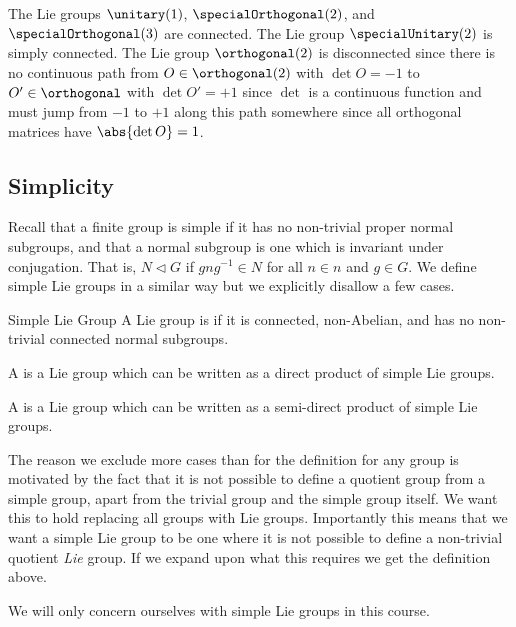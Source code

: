 \documentclass[fleqn]{NotesClass}
\newcommand*{\normalsubgroup}{\vartriangleleft}
\begin{document}
    \begin{exm}{}{}
        The Lie groups \(\unitary(1)\), \(\specialOrthogonal(2)\), and \(\specialOrthogonal(3)\) are connected.
        The Lie group \(\specialUnitary(2)\) is simply connected.
        The Lie group \(\orthogonal(2)\) is disconnected since there is no continuous path from \(O \in \orthogonal(2)\) with \(\det O = -1\) to \(O' \in \orthogonal\) with \(\det O' = +1\) since \(\det\) is a continuous function and must jump from \(-1\) to \(+1\) along this path somewhere since all orthogonal matrices have \(\abs{\det O} = 1\).
    \end{exm}
    
    \subsection{Simplicity}
    Recall that a finite group is simple if it has no non-trivial proper normal subgroups, and that a normal subgroup is one which is invariant under conjugation.
    That is, \(N \normalsubgroup G\) if \(gng^{-1} \in N\) for all \(n \in n\) and \(g \in G\).
    We define simple Lie groups in a similar way but we explicitly disallow a few cases.
    
    \begin{dfn}{Simple Lie Group}{}
        A Lie group is  if it is connected, non-Abelian, and has no non-trivial connected normal subgroups.
        
        A  is a Lie group which can be written as a direct product of simple Lie groups.
        
        A  is a Lie group which can be written as a semi-direct product of simple Lie groups.
    \end{dfn}
    
    The reason we exclude more cases than for the definition for any group is motivated by the fact that it is not possible to define a quotient group from a simple group, apart from the trivial group and the simple group itself.
    We want this to hold replacing all groups with Lie groups.
    Importantly this means that we want a simple Lie group to be one where it is not possible to define a non-trivial quotient \emph{Lie} group.
    If we expand upon what this requires we get the definition above.
    
    We will only concern ourselves with simple Lie groups in this course.
    
\end{document}
